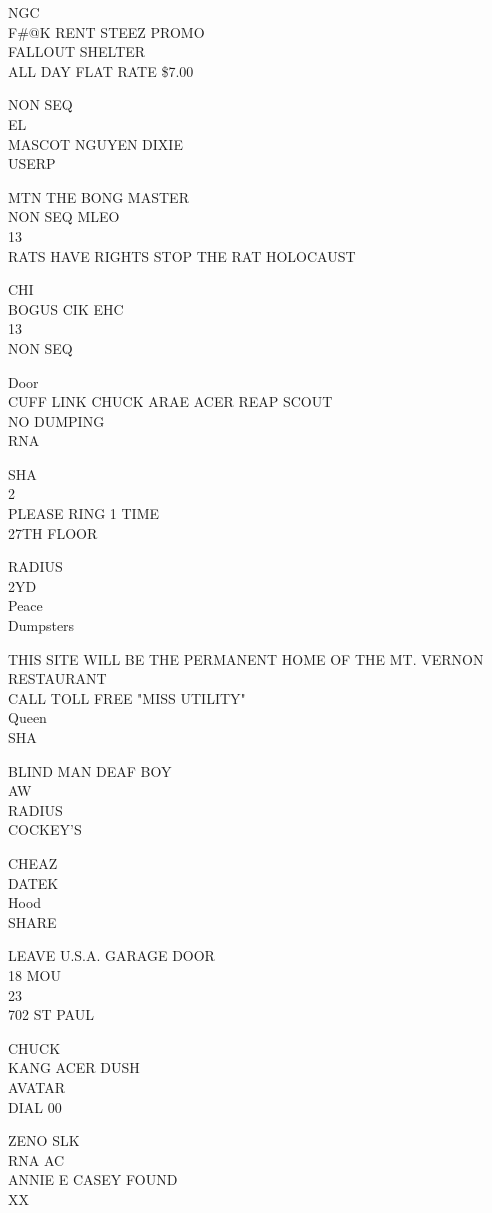 \documentclass[10pt,letterpaper]{article}
\begin{document}
NGC\\
F\#@K RENT STEEZ PROMO\\
FALLOUT SHELTER\\
ALL DAY FLAT RATE \$7.00

NON SEQ\\
EL\\
MASCOT NGUYEN DIXIE\\
USERP

MTN THE BONG MASTER\\
NON SEQ MLEO\\
13\\
RATS HAVE RIGHTS STOP THE RAT HOLOCAUST

CHI\\
BOGUS CIK EHC\\
13\\
NON SEQ

Door\\
CUFF LINK CHUCK ARAE ACER REAP SCOUT\\
NO DUMPING\\
RNA

SHA\\
2\\
PLEASE RING 1 TIME\\
27TH FLOOR

RADIUS\\
2YD\\
Peace\\
Dumpsters

THIS SITE WILL BE THE PERMANENT HOME OF THE MT. VERNON RESTAURANT\\
CALL TOLL FREE "MISS UTILITY"\\
Queen\\
SHA

BLIND MAN DEAF BOY\\
AW\\
RADIUS\\
COCKEY'S

CHEAZ\\
DATEK\\
Hood\\
SHARE

LEAVE U.S.A. GARAGE DOOR\\
18 MOU\\
23\\
702 ST PAUL

CHUCK\\
KANG ACER DUSH\\
AVATAR\\
DIAL 00

ZENO SLK\\
RNA AC\\
ANNIE E CASEY FOUND\\
XX
\end{document}
